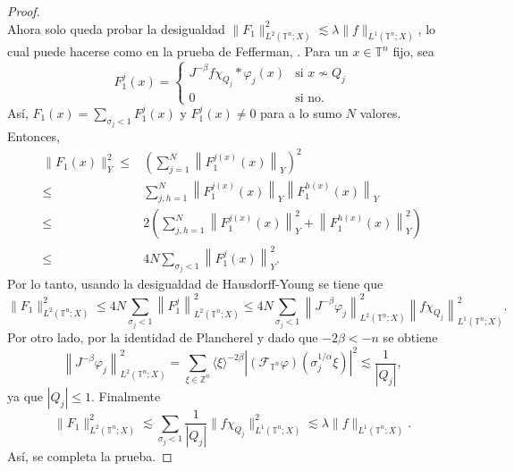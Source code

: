 \begin{proof}
\begin{equation*}
	\end{equation*}
	Ahora solo queda probar la desigualdad $\|F_1\|_{L^2(\mathbb{T}^n; X)}^2 \lesssim \lambda \|f\|_{L^1(\mathbb{T}^n; X)}$, lo cual puede hacerse como en la prueba de Fefferman, \cite{cardona-ruzhansky}. Para un $x \in \mathbb{T}^n$ fijo, sea
	\begin{equation*}
		F_1^j(x) = \begin{cases}
			J^{-\beta} f\chi_{Q_j}*\varphi_j(x) & \text{si }x \nsim Q_j \\ 0 & \text{si no}.
		\end{cases}
	\end{equation*}
	Así, $F_1(x)=\sum_{\sigma_j <1} F_1^j(x)$ y $F_1^j(x) \neq 0$ para a lo sumo $N$ valores. Entonces,
	\begin{align*}
		\|F_1(x)\|_Y^2 \leq & \left( \sum_{j=1}^N\left\|F_1^{j(x)}(x)\right\|_Y \right)^2 \\
		\leq & \sum_{j,h=1}^N\left\|F_1^{j(x)}(x)\right\|_Y \left\|F_1^{h(x)}(x)\right\|_Y \\
		\leq & 2\left( \sum_{j,h=1}^N \left\|F_1^{j(x)}(x)\right\|_Y^2 + \left\|F_1^{h(x)}(x)\right\|_Y^2 \right) \\
		\leq & 4N\sum_{\sigma_j < 1}\left\|F_1^j(x)\right\|_Y^2.
	\end{align*}
	Por lo tanto, usando la desigualdad de Hausdorff-Young se tiene que
	\begin{equation*}
		\|F_1\|_{L^2(\mathbb{T}^n; X)}^2 \leq 4N\sum_{\sigma_j<1} \left\| F_1^j \right\|_{L^2(\mathbb{T}^n; X)}^2 \leq 4N\sum_{\sigma_j<1} \left\| J^{-\beta} \varphi_j \right\|_{L^2(\mathbb{T}^n; X)}^2\left\| f\chi_{Q_j} \right\|_{L^1(\mathbb{T}^n; X)}^2.
	\end{equation*}
	Por otro lado, por la identidad de Plancherel y dado que $-2\beta < -n$ se obtiene
	\begin{equation*}
		\left\| J^{-\beta} \varphi_j \right\|_{L^2(\mathbb{T}^n; X)}^2 = \sum_{\xi \in \mathbb{Z}^n } \langle\xi\rangle^{-2\beta} \left|(\mathcal{F}_{\mathbb{T}^n} \varphi)\left(\sigma_j^{1/\alpha}\xi\right)\right|^2 \lesssim   \frac{1}{|Q_j|},
	\end{equation*}
	ya que $|Q_j| \leq 1$. Finalmente
	\begin{equation*}
		\|F_1\|_{L^2(\mathbb{T}^n; X)}^2 \lesssim \sum_{\sigma_j<1}\frac{1}{|Q_j|} \|f\chi_{Q_j}\|_{L^1(\mathbb{T}^n; X)}^2 \lesssim \lambda \|f\|_{L^1(\mathbb{T}^n; X)}.
	\end{equation*}
	Así, se completa la prueba.
\end{proof}
